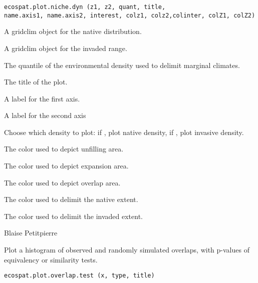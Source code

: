 \documentclass[a4paper]{book}
\begin{document}
%
\begin{Usage}
\begin{verbatim}
ecospat.plot.niche.dyn (z1, z2, quant, title, 
name.axis1, name.axis2, interest, colz1, colz2,colinter, colZ1, colZ2)
\end{verbatim}
\end{Usage}
%
\begin{Arguments}
\begin{ldescription}
\item[\code{z1}] A gridclim object for the native distribution.
\item[\code{z2}] A gridclim object for the invaded range.
\item[\code{quant}] The quantile of the environmental density used to delimit marginal climates.
\item[\code{title}] The title of the plot.
\item[\code{name.axis1}] A label for the first axis.
\item[\code{name.axis2}] A label for the second axis
\item[\code{interest}] Choose which density to plot: if , plot native density, if , plot invasive density.
\item[\code{colz1}] The color used to depict unfilling area.
\item[\code{colz2}] The color used to depict expansion area.
\item[\code{colinter}] The color used to depict overlap area.
\item[\code{colZ1}] The color used to delimit the native extent.
\item[\code{colZ2}] The color used to delimit the invaded extent.

\end{ldescription}
\end{Arguments}
%
\begin{Author}\relax
Blaise Petitpierre 
\end{Author}
%
\begin{Description}\relax
Plot a histogram of observed and randomly simulated overlaps, with p-values of equivalency or similarity tests.
\end{Description}
%
\begin{Usage}
\begin{verbatim}
ecospat.plot.overlap.test (x, type, title)
\end{verbatim}
\end{Usage}
\end{document}
